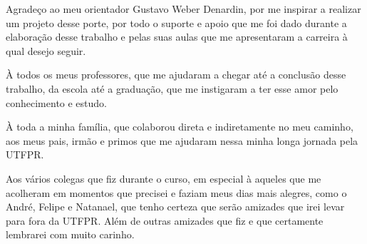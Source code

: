 
\begin{agradecimentos}[AGRADECIMENTOS]

Agradeço ao meu orientador Gustavo Weber Denardin, por me inspirar a realizar um projeto desse porte, por todo o suporte e apoio que me foi dado durante a elaboração desse trabalho e pelas suas aulas que me apresentaram a carreira à qual desejo seguir.

À todos os meus professores, que me ajudaram a chegar até a conclusão desse trabalho, da escola até a graduação, que me instigaram a ter esse amor pelo conhecimento e estudo.

À toda a minha família, que colaborou direta e indiretamente no meu caminho, aos meus pais, irmão e primos que me ajudaram nessa minha longa jornada pela UTFPR.

Aos vários colegas que fiz durante o curso, em especial à aqueles que me acolheram em momentos que precisei e faziam meus dias mais alegres, como o André, Felipe e Natanael, que tenho certeza que serão amizades que irei levar para fora da UTFPR. Além de outras amizades que fiz e que certamente lembrarei com muito carinho.


\end{agradecimentos}
